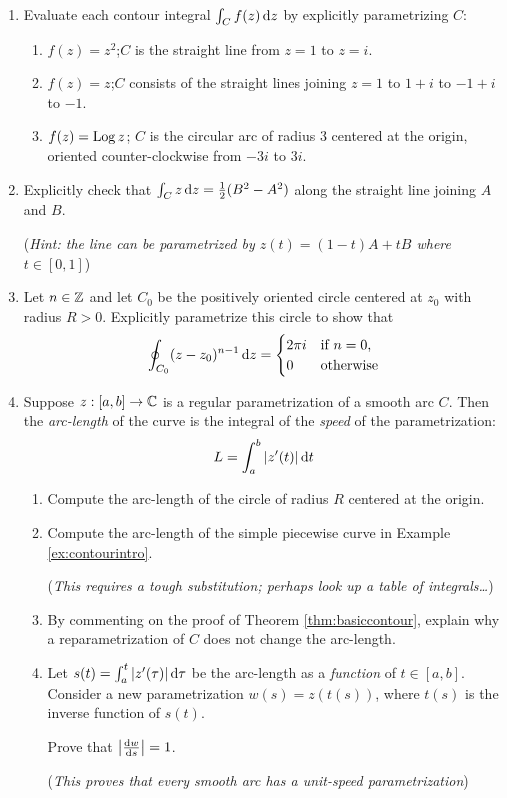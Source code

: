 \begin{exercises*}
\begin{enumerate}
  \item Evaluate each contour integral $\int_Cf(z)\,\dz$ by explicitly parametrizing $C$:
	\begin{enumerate}
    \item $f(z)=z^2$;\quad $C$ is the straight line from $z=1$ to $z=i$.
    
    \item $f(z)=z$;\quad $C$ consists of the straight lines joining $z=1$ to $1+i$ to $-1+i$ to $-1$.
    \item $f(z)=\Log z$; $C$ is the circular arc of radius 3 centered at the origin, oriented counter-clockwise from $-3i$ to $3i$.
	\end{enumerate}
	
	\item Explicitly check that $\int_Cz\,\dz=\frac 12(B^2-A^2)$
	along the straight line joining $A$ and $B$.\par
	(\emph{Hint: the line can be parametrized by $z(t)=(1-t)A+tB$ where $t\in[0,1]$})
	
	\item\label{ex:intpowers} Let $n\in \Z$ and let $C_0$ be the positively oriented circle centered at $z_0$ with radius $R>0$. Explicitly parametrize this circle to show that
	\[\oint_{C_0}(z-z_0)^{n-1}\,\dz=\begin{cases}
	2\pi i&\text{if $n=0$,}\\
	0&\text{otherwise}
	\end{cases}\]
	

  \item Suppose $z:[a,b]\to\C$ is a regular parametrization of a smooth arc $C$. Then the \emph{arc-length} of the curve is the integral of the \emph{speed} of the parametrization:
  \[L=\int_a^{b}\nm{z'(t)}\dt\]
  \begin{enumerate}
    \item Compute the arc-length of the circle of radius $R$ centered at the origin.
    
    \item Compute the arc-length of the simple piecewise curve in Example \ref{ex:contourintro}.\par
    (\emph{This requires a tough substitution; perhaps look up a table of integrals\ldots})
    
    \item By commenting on the proof of Theorem \ref{thm:basiccontour}, explain why a reparametrization of $C$ does not change the arc-length.
    
    \item Let $s(t)=\int_a^{t}\nm{z'(\tau)}\D\tau$ be the arc-length as a \emph{function} of $t\in[a,b]$. Consider a new parametrization $w(s)=z(t(s))$, where $t(s)$ is the inverse function of $s(t)$.\par Prove that $\nm{\diff[w]{s}}=1$.\par
  (\emph{This proves that every smooth arc has a unit-speed parametrization})
  \end{enumerate}\bigbreak
  

\end{enumerate}
\end{exercises*}

